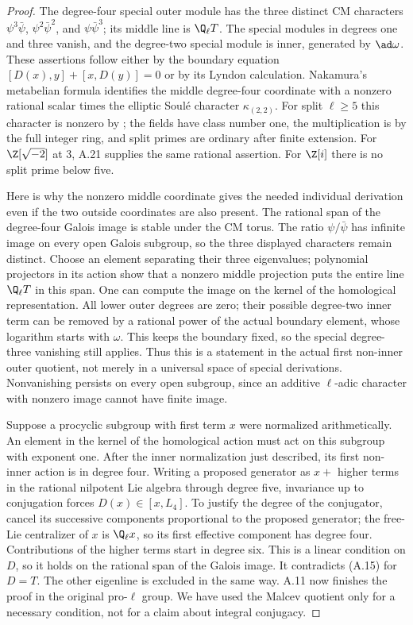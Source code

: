 \begin{proof}
The degree-four special outer module has the three distinct CM
characters $\psi^3\bar\psi$, $\psi^2\bar\psi^2$, and
$\psi\bar\psi^3$; its middle line is $\Q_\ell T$.
The special modules in degrees one and three vanish, and the
degree-two special module is inner, generated by $\ad\omega$.
These assertions follow either by the boundary equation
$[D(x),y]+[x,D(y)]=0$ or by its Lyndon calculation.
Nakamura's metabelian formula
\cite[Theorem A, Corollary 4.12]{Nakamura1995} identifies the middle
degree-four coordinate with a nonzero rational scalar times the
elliptic Soul\'e character $\kappa_{(2,2)}$. For split $\ell\ge5$
this character is nonzero by \cite[Theorem 4.5 and Corollary 4.10]{Ishii2025};
the fields have class number one, the multiplication is by the full
integer ring, and split primes are ordinary after finite extension.
For $\Z[\sqrt{-2}]$ at $3$, A.21 supplies the same rational assertion.
For $\Z[i]$ there is no split prime below five.

Here is why the nonzero middle coordinate gives the needed individual
derivation even if the two outside coordinates are also present.
The rational span of the degree-four Galois image is stable under the
CM torus. The ratio $\psi/\bar\psi$ has infinite image on every open
Galois subgroup, so the three displayed characters remain distinct.
Choose an element separating their three eigenvalues; polynomial
projectors in its action show that a nonzero middle projection puts
the entire line $\Q_\ell T$ in this span. One can compute the image
on the kernel of the homological representation. All lower outer
degrees are zero; their possible degree-two inner term can be
removed by a rational power of the actual boundary element, whose
logarithm starts with $\omega$. This keeps the boundary fixed, so
the special degree-three vanishing still applies. Thus this is a statement in the
actual first non-inner outer quotient, not merely in a universal
space of special derivations. Nonvanishing persists on every open
subgroup, since an additive $\ell$-adic character with nonzero image
cannot have finite image.

Suppose a procyclic subgroup with first term $x$ were normalized
arithmetically. An element in the kernel of the homological action
must act on this subgroup with exponent one. After the inner
normalization just described, its first non-inner action is in
degree four. Writing a proposed generator as $x+$ higher terms in
the rational nilpotent Lie algebra through degree five, invariance
up to conjugation forces $D(x)\in[x,L_4]$. To justify the degree of
the conjugator, cancel its successive components proportional to
the proposed generator; the free-Lie centralizer of $x$ is
$\Q_\ell x$, so its first effective component has degree four.
Contributions of the
higher terms start in degree six. This is a linear condition on
$D$, so it holds on the rational span of the Galois image. It
contradicts (A.15) for $D=T$. The other eigenline is excluded in
the same way. A.11 now finishes the proof in the original pro-$\ell$
group. We have used the Malcev quotient only for a necessary
condition, not for a claim about integral conjugacy.
\end{proof}

